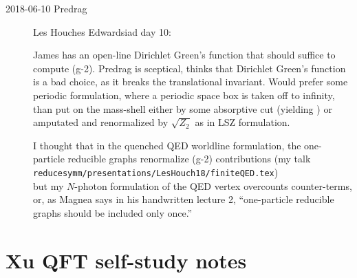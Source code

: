 \begin{description}
\item[2018-06-10 Predrag] Les Houches Edwardsiad day 10:

James has an open-line Dirichlet Green's function that should suffice
to compute (g-2). Predrag is sceptical, thinks that Dirichlet Green's function
is a bad choice, as it breaks the translational invariant. Would prefer
some periodic formulation, where a periodic space box is taken off to
infinity, than put on the mass-shell either by some absorptive cut
(yielding ) or amputated and renormalized by
$\sqrt{Z_2}$ as in LSZ formulation.

I thought that in the quenched QED worldline formulation, the
one-particle reducible graphs renormalize (g-2) contributions (my talk\\
\texttt{reducesymm/presentations/LesHouch18/finiteQED.tex}) \\
but my $N$-photon formulation of the QED vertex overcounts counter-terms,
or, as Magnea says in his handwritten
 {lecture 2},
``one-particle reducible graphs should be included only once.''


\end{description}


\section{Xu QFT self-study notes}
\label{c-dailyBlogGX}

